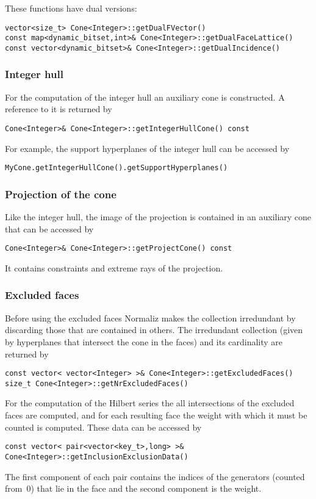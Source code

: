 \begin{small}
These functions have dual versions:

\begin{Verbatim}
vector<size_t> Cone<Integer>::getDualFVector()
const map<dynamic_bitset,int>& Cone<Integer>::getDualFaceLattice()
const vector<dynamic_bitset>& Cone<Integer>::getDualIncidence()
\end{Verbatim}

\subsubsection{Integer hull}

For the computation of the integer hull an auxiliary cone is constructed. A reference to it is returned by
\begin{Verbatim}
Cone<Integer>& Cone<Integer>::getIntegerHullCone() const
\end{Verbatim}

For example, the support hyperplanes of the integer hull can be accessed by
\begin{Verbatim}
MyCone.getIntegerHullCone().getSupportHyperplanes()
\end{Verbatim}

\subsubsection{Projection of the cone}

Like the integer hull, the image of the projection is contained in an auxiliary cone that can be accessed by
\begin{Verbatim}
Cone<Integer>& Cone<Integer>::getProjectCone() const
\end{Verbatim}

It contains constraints and extreme rays of the projection.

\subsubsection{Excluded faces}

Before using the excluded faces Normaliz makes the collection irredundant by discarding those that are contained in others. The irredundant collection (given by hyperplanes that intersect the cone in the faces) and its cardinality are returned by
\begin{Verbatim}
const vector< vector<Integer> >& Cone<Integer>::getExcludedFaces()
size_t Cone<Integer>::getNrExcludedFaces()
\end{Verbatim}
For the computation of the Hilbert series the all intersections of the excluded faces are computed, and for each resulting face the weight with which it must be counted is computed. These data can be accessed by
\begin{Verbatim}
const vector< pair<vector<key_t>,long> >& Cone<Integer>::getInclusionExclusionData()
\end{Verbatim}
The first component of each pair contains the indices of the generators (counted from~$0$) that lie in the face and the second component is the weight.


\end{small}
